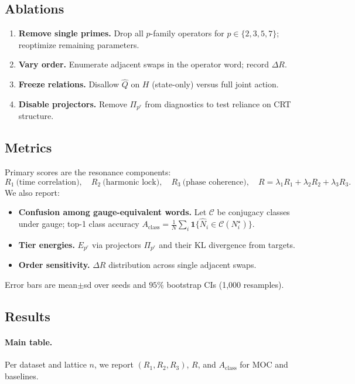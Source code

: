 \documentclass[12pt]{article}
\numberwithin{equation}{section}
\theoremstyle{plain}
\theoremstyle{definition}
\theoremstyle{remark}
\begin{document}
\subsection*{Ablations}
\begin{enumerate}
  \item \textbf{Remove single primes.} Drop all $p$-family operators for $p\in\{2,3,5,7\}$; reoptimize remaining parameters.
  \item \textbf{Vary order.} Enumerate adjacent swaps in the operator word; record $\Delta R$.
  \item \textbf{Freeze relations.} Disallow $\hat{Q}$ on $H$ (state-only) versus full joint action.
  \item \textbf{Disable projectors.} Remove $\Pi_{p^r}$ from diagnostics to test reliance on CRT structure.
\end{enumerate}

\subsection*{Metrics}
Primary scores are the resonance components:
\[
R_1\ \text{(time correlation)},\quad R_2\ \text{(harmonic lock)},\quad R_3\ \text{(phase coherence)},\quad
R=\lambda_1R_1+\lambda_2R_2+\lambda_3R_3.
\]
We also report:
\begin{itemize}
  \item \textbf{Confusion among gauge-equivalent words.} Let $\mathcal{C}$ be conjugacy classes under gauge; top-1 class accuracy
  $A_{\mathrm{class}}=\frac{1}{N}\sum_i \mathbf{1}\{\widehat{N}_i\in \mathcal{C}(N_i^\star)\}$.
  \item \textbf{Tier energies.} $E_{p^r}$ via projectors $\Pi_{p^r}$ and their KL divergence from targets.
  \item \textbf{Order sensitivity.} $\Delta R$ distribution across single adjacent swaps.
\end{itemize}
Error bars are mean$\pm$sd over seeds and $95\%$ bootstrap CIs (1{,}000 resamples).

\subsection*{Results}
\paragraph{Main table.} Per dataset and lattice $n$, we report $(R_1,R_2,R_3)$, $R$, and $A_{\mathrm{class}}$ for MOC and baselines.
\end{document}
